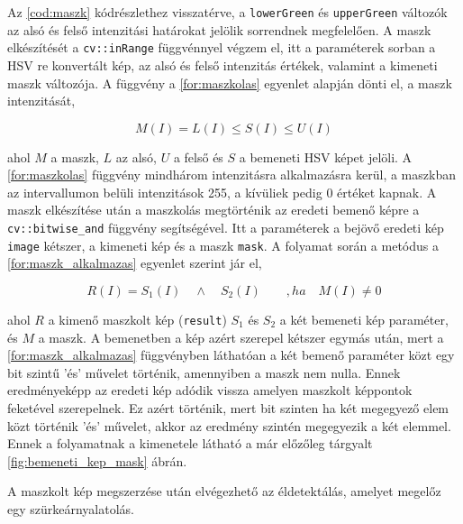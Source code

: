 \par Az \ref{cod:maszk} kódrészlethez visszatérve, a \lstinline{lowerGreen} és \lstinline{upperGreen} változók az alsó és felső intenzitási határokat jelölik sorrendnek megfelelően. A maszk elkészítését a \lstinline{cv::inRange} függvénnyel \cite{opencv_docs} végzem el, itt a paraméterek sorban a HSV re konvertált kép, az alsó és felső intenzitás értékek, valamint a kimeneti maszk változója.
\newline A függvény a \ref{for:maszkolas} egyenlet alapján dönti el, a maszk intenzitását,

\begin{equation}
    M(I) = L(I) \le S(I) \le U(I)
    \label{for:maszkolas}
\end{equation}

\par ahol $M$ a maszk, $L$ az alsó, $U$ a felső és $S$ a bemeneti HSV képet jelöli. A \ref{for:maszkolas} függvény mindhárom intenzitásra alkalmazásra kerül, a maszkban az intervallumon belüli intenzitások 255, a kívüliek pedig 0 értéket kapnak. A maszk elkészítése után a maszkolás megtörténik az eredeti bemenő képre a \lstinline{cv::bitwise_and} függvény \cite{opencv_docs} segítségével. Itt a paraméterek a bejövő eredeti kép \lstinline{image} kétszer, a kimeneti kép és a maszk \lstinline{mask}.
\newline A folyamat során a metódus a \ref{for:maszk_alkalmazas} egyenlet szerint jár el,

\begin{equation}
    R(I) = S_1(I)\quad \land\quad S_2(I)\qquad ,ha\quad M(I) \ne 0
    \label{for:maszk_alkalmazas}
\end{equation}

\par ahol $R$ a kimenő maszkolt kép (\lstinline{result}) $S_1$ és $S_2$ a két bemeneti kép paraméter, és $M$ a maszk. A bemenetben a kép azért szerepel kétszer egymás után, mert a \ref{for:maszk_alkalmazas} függvényben láthatóan a két bemenő paraméter közt egy bit szintű 'és' művelet történik, amennyiben a maszk nem nulla. Ennek eredményeképp az eredeti kép adódik vissza amelyen maszkolt képpontok feketével szerepelnek. Ez azért történik, mert bit szinten ha két megegyező elem közt történik 'és' művelet, akkor az eredmény szintén megegyezik a két elemmel. Ennek a folyamatnak a kimenetele látható a már előzőleg tárgyalt \ref{fig:bemeneti_kep_mask} ábrán.
\par A maszkolt kép megszerzése után elvégezhető az éldetektálás, amelyet megelőz egy szürkeárnyalatolás.

